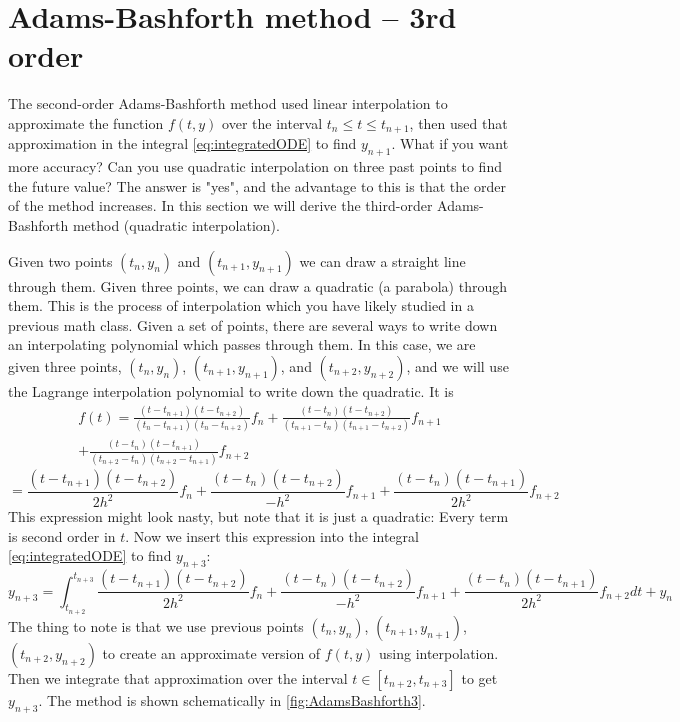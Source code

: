 \documentclass[hidelinks,notitlepage]{book}
\begin{document}
\section{Adams-Bashforth method -- 3rd order}
The second-order Adams-Bashforth method used linear interpolation to approximate the function $f(t,y)$ over the interval $t_n \le t \le t_{n+1}$, then used that approximation in the integral \cref{eq:integratedODE} to find $y_{n+1}$.  What if you want more accuracy?  Can you use quadratic interpolation on three past points to find the future value?  The answer is "yes", and the advantage to this is that the order of the method increases.  In this section we will derive the third-order Adams-Bashforth method (quadratic interpolation).  

Given two points $(t_n, y_n)$ and $(t_{n+1}, y_{n+1})$ we can draw a straight line through them.  Given three points, we can draw a quadratic (a parabola) through them.  This is the process of interpolation which you have likely studied in a previous math class.  Given a set of points, there are several ways to write down an interpolating polynomial which passes through them.  In this case, we are given three points, $(t_n, y_n)$, $(t_{n+1}, y_{n+1})$, and $(t_{n+2}, y_{n+2})$, and we will use the Lagrange interpolation polynomial to write down the quadratic.  It is
\begin{gather}
\label{eq:LagrangeInterpolation}
\nonumber
f(t) = \frac{(t-t_{n+1})(t-t_{n+2})}{(t_{n}-t_{n+1})(t_{n}-t_{n+2})} f_{n}
+\frac{(t-t_{n})(t-t_{n+2})}{(t_{n+1}-t_{n})(t_{n+1}-t_{n+2})} f_{n+1} \\
\nonumber
+\frac{(t-t_{n})(t-t_{n+1})}{(t_{n+2}-t_{n})(t_{n+2}-t_{n+1})} f_{n+2}
\end{gather}
\begin{equation}
\label{eq:LagrangeInterpolation1}
\nonumber
= \frac{(t-t_{n+1})(t-t_{n+2})}{2 h^2} f_{n}
+\frac{(t-t_{n})(t-t_{n+2})}{-h^2} f_{n+1}
+\frac{(t-t_{n})(t-t_{n+1})}{2 h^2} f_{n+2}
\end{equation}
This expression might look nasty, but note that it is just a quadratic:  Every term is second order in $t$.  Now we insert this expression into the integral \cref{eq:integratedODE} to find $y_{n+3}$:  
\begin{equation}
\nonumber
y_{n+3} = \int_{t_{n+2}}^{t_{n+3}} 
\frac{(t-t_{n+1})(t-t_{n+2})}{2 h^2} f_{n}
+\frac{(t-t_{n})(t-t_{n+2})}{-h^2} f_{n+1}
+\frac{(t-t_{n})(t-t_{n+1})}{2 h^2} f_{n+2}
dt 
+ y_n
\end{equation}
The thing to note is that we use previous points $(t_{n}, y_{n})$, $(t_{n+1}, y_{n+1})$, $(t_{n+2}, y_{n+2})$ to create an approximate version of $f(t, y)$ using interpolation.  Then we integrate that approximation over the interval $t \in [t_{n+2}, t_{n+3}]$ to get $y_{n+3}$.  The method is shown schematically in \cref{fig:AdamsBashforth3}.
\end{document}
